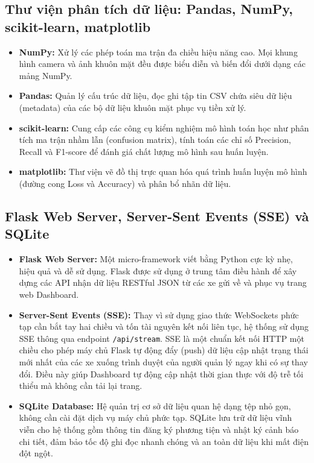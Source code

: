 \documentclass[../DoAn.tex]{subfiles}
\begin{document}
\subsection{Thư viện phân tích dữ liệu: Pandas, NumPy, scikit-learn, matplotlib}
\begin{itemize}
    \item \textbf{NumPy:} Xử lý các phép toán ma trận đa chiều hiệu năng cao. Mọi khung hình camera và ảnh khuôn mặt đều được biểu diễn và biến đổi dưới dạng các mảng NumPy.
    \item \textbf{Pandas:} Quản lý cấu trúc dữ liệu, đọc ghi tập tin CSV chứa siêu dữ liệu (metadata) của các bộ dữ liệu khuôn mặt phục vụ tiền xử lý.
    \item \textbf{scikit-learn:} Cung cấp các công cụ kiểm nghiệm mô hình toán học như phân tích ma trận nhầm lẫn (confusion matrix), tính toán các chỉ số Precision, Recall và F1-score để đánh giá chất lượng mô hình sau huấn luyện.
    \item \textbf{matplotlib:} Thư viện vẽ đồ thị trực quan hóa quá trình huấn luyện mô hình (đường cong Loss và Accuracy) và phân bổ nhãn dữ liệu.
\end{itemize}

\subsection{Flask Web Server, Server-Sent Events (SSE) và SQLite}
\begin{itemize}
    \item \textbf{Flask Web Server:} Một micro-framework viết bằng Python cực kỳ nhẹ, hiệu quả và dễ sử dụng. Flask được sử dụng ở trung tâm điều hành để xây dựng các API nhận dữ liệu RESTful JSON từ các xe gửi về và phục vụ trang web Dashboard.
    \item \textbf{Server-Sent Events (SSE):} Thay vì sử dụng giao thức WebSockets phức tạp cần bắt tay hai chiều và tốn tài nguyên kết nối liên tục, hệ thống sử dụng SSE thông qua endpoint \texttt{/api/stream}. SSE là một chuẩn kết nối HTTP một chiều cho phép máy chủ Flask tự động đẩy (push) dữ liệu cập nhật trạng thái mới nhất của các xe xuống trình duyệt của người quản lý ngay khi có sự thay đổi. Điều này giúp Dashboard tự động cập nhật thời gian thực với độ trễ tối thiểu mà không cần tải lại trang.
    \item \textbf{SQLite Database:} Hệ quản trị cơ sở dữ liệu quan hệ dạng tệp nhỏ gọn, không cần cài đặt dịch vụ máy chủ phức tạp. SQLite lưu trữ dữ liệu vĩnh viễn cho hệ thống gồm thông tin đăng ký phương tiện và nhật ký cảnh báo chi tiết, đảm bảo tốc độ ghi đọc nhanh chóng và an toàn dữ liệu khi mất điện đột ngột.
\end{itemize}
\end{document}
